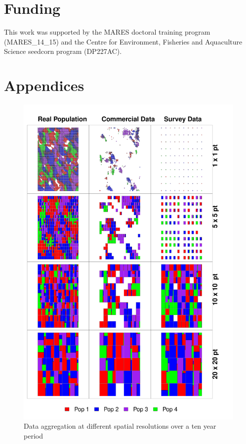 \documentclass[review]{elsarticle}
\begin{document}
\section*{Funding} This work was supported by the MARES doctoral training
program (MARES\_14\_15) and the Centre for Environment, Fisheries and
Aquaculture Science seedcorn program (DP227AC).

\section*{Appendices}



\clearpage
\footnotesize



\begin{figure}[!ht]
	\includegraphics[width=\linewidth]{../analysis/Data_Aggregation_space_Rev}
	\caption{Data aggregation at different spatial resolutions over a
		ten year period}
	\label{fig:1}
\end{figure}	
\end{document}
